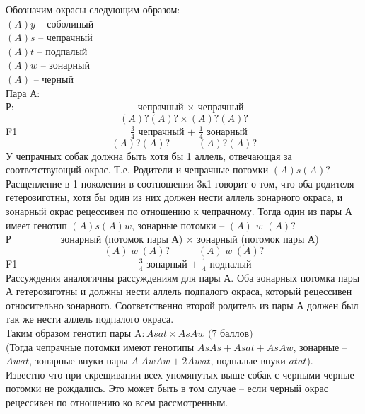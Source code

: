 \solutionSection
Обозначим окрасы следующим образом:\\
$(A)y$ – соболиный\\
$(A)s$ – чепрачный\\
$(A)t$ – подпалый\\
$(A)w$ – зонарный\\
$(A)$ – черный\\
Пара А:\\
Р:$\hspace{150pt}$чепрачный $\times$ чепрачный
$$(A)?(A)?\times(A)?(A)?$$
F1$\hspace{137pt}\frac{3}{4}$ чепрачный $+$ $\frac{1}{4}$ зонарный
$$(A)?(A)?\hspace{34pt}(A)?(A)?$$
У чепрачных собак должна быть хотя бы  1 аллель, отвечающая за соответствующий окрас. Т.е. Родители и чепрачные потомки $(A)s(A)$? Расщепление в  1 поколении в соотношении 3к1 говорит о том, что оба родителя гетерозиготны, хотя бы один из них должен нести аллель зонарного окраса, и зонарный окрас рецессивен по отношению к чепрачному. Тогда один из пары А имеет генотип $(A)s(A)w$, зонарные потомки – $(A)$ $w$ $(A)$?\\
Р$\hspace{60pt}$зонарный (потомок пары А) $\times$ зонарный (потомок пары А) 
$$(A)\hspace{3pt}w\hspace{3pt}(A)?\hspace{34pt}(A)\hspace{3pt}w\hspace{3pt}(A)?$$
F1$\hspace{147pt}\frac{3}{4}$ зонарный $+$ $\frac{1}{4}$ подпалый\\
Рассуждения аналогичны рассуждениям для пары А. Оба зонарных потомка пары А гетерозиготны и  должны нести аллель подпалого окраса, который рецессивен относительно зонарного. Соответственно второй родитель из пары А должен был так же нести аллель подпалого окраса.\\
Таким образом генотип пары A$: Asat \times AsAw$ $\textit{(7 баллов)}$\\
(Тогда чепрачные потомки имеют генотипы $AsAs + Asat + AsAw$, зонарные – $Awat$, зонарные внуки пары $A\hspace{3pt}AwAw +2 Awat$, подпалые внуки $atat$).\\
Известно что при скрещивании всех упомянутых выше собак с черными черные потомки не рождались. Это может быть в том случае – если черный окрас рецессивен по отношению ко всем рассмотренным.\\
